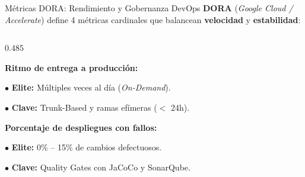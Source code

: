 \documentclass[aspectratio=169]{beamer}
\begin{document}
\begin{frame}{Métricas DORA: Rendimiento y Gobernanza DevOps}
  \vspace{-0.45cm}
  {\scriptsize \textbf{DORA} (\textit{Google Cloud / Accelerate}) define 4 métricas cardinales que balancean \textbf{velocidad} y \textbf{estabilidad}:}
  \vspace{0.15cm}

  \begin{columns}[T,onlytextwidth]
    \begin{column}{0.485\textwidth}
      \begin{tcolorbox}[colback=cbBlue!8,colframe=cbBlue,arc=3pt,title=\textbf{1. Frecuencia de Despliegue (DF)},coltitle=cbWhite,fonttitle=\bfseries\scriptsize,top=2.5pt,bottom=2.5pt,left=5pt,right=5pt]
        {\tiny
        \textbf{Ritmo de entrega a producción:}\par\vspace{1pt}
        $\bullet$ \textbf{Elite:} Múltiples veces al día (\textit{On-Demand}).\par
        $\bullet$ \textbf{Clave:} Trunk-Based y ramas efímeras ($<$ 24h).
        }
      \end{tcolorbox}
      \vspace{0.15cm}
      \begin{tcolorbox}[colback=cbOrange!8,colframe=cbOrange,arc=3pt,title=\textbf{3. Tasa de Fallos en Cambios (CFR)},coltitle=cbWhite,fonttitle=\bfseries\scriptsize,top=2.5pt,bottom=2.5pt,left=5pt,right=5pt]
        {\tiny
        \textbf{Porcentaje de despliegues con fallos:}\par\vspace{1pt}
        $\bullet$ \textbf{Elite:} 0\% -- 15\% de cambios defectuosos.\par
        $\bullet$ \textbf{Clave:} Quality Gates con JaCoCo y SonarQube.
        }
      \end{tcolorbox}
    \end{column}


\end{columns}
\end{frame}
\end{document}
